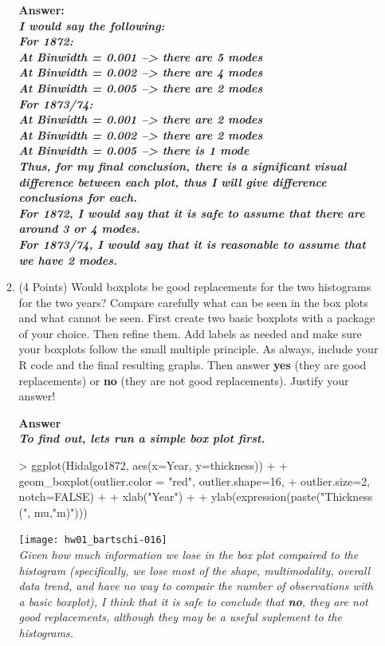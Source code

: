 \documentclass[12pt,letterpaper,final]{article}
\begin{document}
\begin{enumerate}
\begin{enumerate}
{\bf Answer:\\\it I would say the following:\\
For 1872:\\
At Binwidth = 0.001 --> there are 5 modes\\
At Binwidth = 0.002 --> there are 4 modes\\
At Binwidth = 0.005 --> there are 2 modes\\
For 1873/74:\\
At Binwidth = 0.001 --> there are 2 modes\\
At Binwidth = 0.002 --> there are 2 modes\\
At Binwidth = 0.005 --> there is 1 mode\\
Thus, for my final conclusion, there is a significant visual difference between each plot, thus I will give difference conclusions for each.\\
For 1872, I would say that it is safe to assume that there are around 3 or 4 modes.\\
For 1873/74, I would say that it is reasonable to assume that we have 2 modes.}

\item (4 Points) Would boxplots be good replacements for the two histograms
for the two years? Compare carefully what can be seen in the box plots
and what cannot be seen.
First create two basic boxplots with a package of your choice. Then refine them.
Add labels as needed and make sure your boxplots follow the
small multiple principle.
As always, include your R code and the final resulting graphs.
Then answer {\bf yes} (they are good replacements) or {\bf no}
(they are not good replacements). Justify your answer!

{\bf Answer\\\it To find out, lets run a simple box plot first.}
\begin{Schunk}
\begin{Sinput}
> ggplot(Hidalgo1872, aes(x=Year, y=thickness)) +
+   geom_boxplot(outlier.color = "red", outlier.shape=16,
+   outlier.size=2, notch=FALSE) +
+   xlab("Year") +
+   ylab(expression(paste("Thickness (", mu,"m)")))
\end{Sinput}
\end{Schunk}
\texttt{[image: hw01\_bartschi-016]}
~\\
{\it Given how much information we lose in the box plot compaired to the histogram (specifically, we lose most of the shape, multimodality, overall data trend, and have no way to compair the number of observations with a basic boxplot), I think that it is safe to conclude that {\bf no}, they are not good replacements, although they may be a useful suplement to the histograms.}



\end{enumerate}
\end{enumerate}
\end{document}
